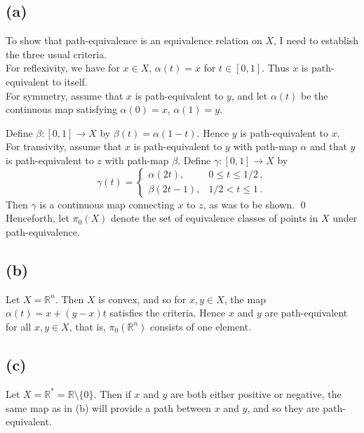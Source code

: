 \documentclass[11pt]{amsart}
\theoremstyle{definition}
\newcommand{\R}{\mathbb{R}}
\numberwithin{equation}{section}
\begin{document}
\subsection*{(a)}
To show that path-equivalence is an equivalence relation on $X$, I need to establish the three usual criteria.
\\

For reflexivity, we have for $x \in X$, $\alpha(t) = x$ for $t\in [0,1]$. Thus $x$ is path-equivalent to itself.
\\

For symmetry, assume that $x$ is path-equivalent to $y$, and let $\alpha(t)$ be the continuous map satisfying $\alpha(0) = x$, $\alpha(1) = y$.

Define $\beta: [0,1] \to X$ by $\beta(t) = \alpha(1-t)$. Hence $y$ is path-equivalent to $x$.
\\

For transivity, assume that $x$ is path-equivalent to $y$ with path-map $\alpha$ and that $y$ is path-equivalent to $z$ with path-map $\beta$. Define $\gamma:[0,1] \to X$ by
\begin{equation}
\gamma(t) = 
\left\{
\begin{array}{lc}
\alpha(2t),&0\leq t \leq 1/2\,,\\
\beta(2t-1),&1/2<t\leq 1\,.
\end{array}
\right.
\end{equation}
Then $\gamma$ is a continuous map connecting $x$ to $z$, as was to be shown.
\qed
\\

Henceforth, let $\pi_0(X)$ denote the set of equivalence classes of points in $X$ under path-equivalence.

\subsection*{(b)}
Let $X = \R^n$. Then $X$ is convex, and so for $x,y \in X$, the map
$\alpha(t)
=
x + (y-x)t$
satisfies the criteria. Hence $x$ and $y$ are path-equivalent for all $x,y \in X$, that is, $\pi_0(\R^n)$ consists of one element.

\subsection*{(c)}
Let $X = \R^* = \R \setminus \{0\}$. Then if $x$ and $y$ are both either positive or negative, the same map as in (b) will provide a path between $x$ and $y$, and so they are path-equivalent. 
\end{document}

